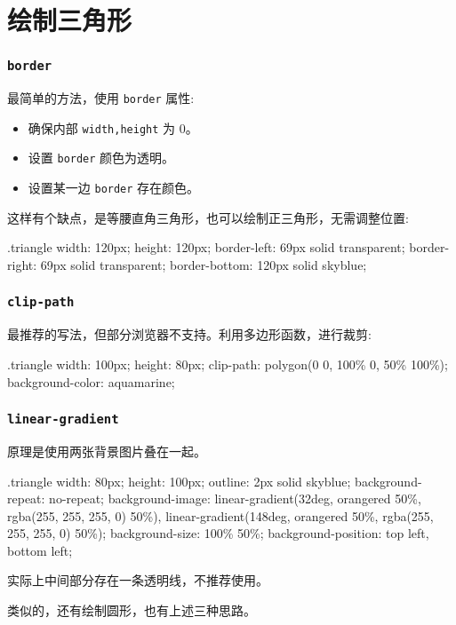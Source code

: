 \section{绘制三角形}

\subsubsection*{\texttt{border}}

最简单的方法，使用 \texttt{border} 属性:
\begin{itemize}
  \item 确保内部 \texttt{width,height} 为 0。
  \item 设置 \texttt{border} 颜色为透明。
  \item 设置某一边 \texttt{border} 存在颜色。
\end{itemize}


这样有个缺点，是等腰直角三角形，也可以绘制正三角形，无需调整位置:

\begin{HTML}
.triangle {
  width: 120px;
  height: 120px;
  border-left: 69px solid transparent;  
	border-right: 69px solid transparent;  
	border-bottom: 120px solid skyblue;
}
\end{HTML}

\subsubsection*{\texttt{clip-path}}

最推荐的写法，但部分浏览器不支持。利用多边形函数，进行裁剪:

\begin{HTML}
.triangle {
  width: 100px;
  height: 80px;
  clip-path: polygon(0 0, 100\% 0, 50\% 100\%);
  background-color: aquamarine;
}
\end{HTML}

\subsubsection*{\texttt{linear-gradient}}

原理是使用两张背景图片叠在一起。

\begin{HTML}
.triangle {
  width: 80px;
  height: 100px;
  outline: 2px solid skyblue;
  background-repeat: no-repeat;
	background-image: linear-gradient(32deg, orangered 50\%, rgba(255, 255, 255, 0) 50\%), linear-gradient(148deg, orangered 50\%, rgba(255, 255, 255, 0) 50\%);
	background-size: 100\% 50\%;
	background-position: top left, bottom left;
}
\end{HTML}

实际上中间部分存在一条透明线，不推荐使用。

类似的，还有绘制圆形，也有上述三种思路。
